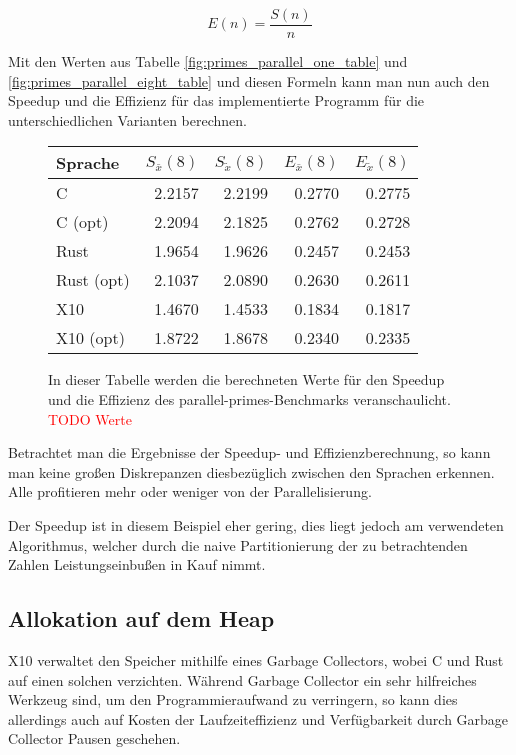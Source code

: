 \begin{equation}
	\label{formula:effizienz}
	E(n) = \frac{S(n)}{n}
\end{equation}

Mit den Werten aus Tabelle \ref{fig:primes_parallel_one_table} und \ref{fig:primes_parallel_eight_table} und diesen
Formeln kann man nun auch den Speedup und die Effizienz für das implementierte Programm für die unterschiedlichen
Varianten berechnen.

\begin{figure}[hb]
	\begin{center}
		\begin{tabular}{lrrrr}
			\toprule
			Sprache & $S_\bar{x}(8)$ & $S_\tilde{x}(8)$ &  $E_\bar{x}(8)$ & $E_\tilde{x}(8)$ \\
			\midrule
			C          & 2.2157 & 2.2199 & 0.2770 & 0.2775 \\
			C (opt)    & 2.2094 & 2.1825 & 0.2762 & 0.2728 \\
			Rust       & 1.9654 & 1.9626 & 0.2457 & 0.2453 \\
			Rust (opt) & 2.1037 & 2.0890 & 0.2630 & 0.2611 \\
			X10        & 1.4670 & 1.4533 & 0.1834 & 0.1817 \\
			X10 (opt)  & 1.8722 & 1.8678 & 0.2340 & 0.2335 \\
			\bottomrule
		\end{tabular}
	\end{center}
	\caption{
		In dieser Tabelle werden die berechneten Werte für den Speedup und die Effizienz des parallel-primes-Benchmarks
		veranschaulicht.
		\textcolor{red}{TODO Werte}
	}
	\label{fig:primes_parallel_speedup_efficiency_table}
\end{figure}

Betrachtet man die Ergebnisse der Speedup- und Effizienzberechnung, so kann man keine großen Diskrepanzen 
diesbezüglich zwischen den Sprachen erkennen. Alle profitieren mehr oder weniger von der Parallelisierung.

Der Speedup ist in diesem Beispiel eher gering, dies liegt jedoch am verwendeten Algorithmus, welcher durch
die naive Partitionierung der zu betrachtenden Zahlen Leistungseinbußen in Kauf nimmt.

\subsection{Allokation auf dem Heap}

X10 verwaltet den Speicher mithilfe eines Garbage Collectors, wobei C und Rust auf einen solchen verzichten.
Während Garbage Collector ein sehr hilfreiches Werkzeug sind, um den Programmieraufwand zu verringern, so kann dies
allerdings auch auf Kosten der Laufzeiteffizienz und Verfügbarkeit durch Garbage Collector Pausen geschehen.

